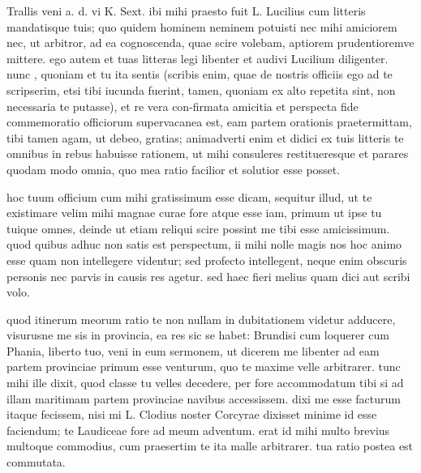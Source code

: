 


 Trallis veni a. d. vi K. Sext. ibi mihi praesto fuit L. Lucilius cum litteris mandatisque tuis; quo quidem hominem neminem potuisti nec mihi amiciorem nec, ut arbitror, ad ea cognoscenda, quae scire volebam, aptiorem prudentioremve mittere. ego autem et tuas litteras legi libenter et audivi Lucilium diligenter. nunc , quoniam et tu ita sentis (scribis enim, quae de nostris officiis ego ad te scripserim, etsi tibi iucunda fuerint, tamen, quoniam ex alto repetita sint, non necessaria te putasse), et re vera con-firmata amicitia et perspecta fide commemoratio officiorum supervacanea est, eam partem orationis praetermittam, tibi tamen agam, ut debeo, gratias; animadverti enim et didici ex tuis litteris te omnibus in rebus habuisse rationem, ut mihi consuleres restitueresque et parares quodam modo omnia, quo mea ratio facilior et solutior esse posset.

 hoc tuum officium cum mihi gratissimum esse dicam, sequitur illud, ut te existimare velim mihi magnae curae fore atque esse iam, primum ut ipse tu tuique omnes, deinde ut etiam reliqui scire possint me tibi esse amicissimum. quod quibus adhuc non satis est perspectum, ii mihi nolle magis nos hoc animo esse quam non intellegere videntur; sed profecto intellegent, neque enim obscuris personis nec parvis in causis res agetur. sed haec fieri melius quam dici aut scribi volo.

 quod itinerum meorum ratio te non nullam in dubitationem videtur adducere, visurusne me sis in provincia, ea res sic se habet: Brundisi cum loquerer cum Phania, liberto tuo, veni in eum sermonem, ut dicerem me libenter ad eam partem provinciae primum esse venturum, quo te maxime velle arbitrarer. tunc mihi ille dixit, quod classe tu velles decedere, per fore accommodatum tibi si ad illam maritimam partem provinciae navibus accessissem. dixi me esse facturum itaque fecissem, nisi mi L. Clodius noster Corcyrae dixisset minime id esse faciendum; te Laudiceae fore ad meum adventum. erat id mihi multo brevius multoque commodius, cum praesertim te ita malle arbitrarer. tua ratio postea est commutata.

